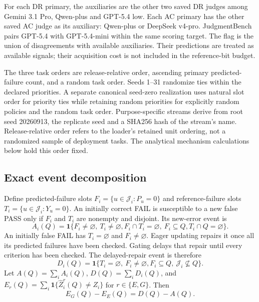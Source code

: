 For each DR primary, the auxiliaries are the other two saved DR judges
among Gemini 3.1 Pro, Qwen-plus and GPT-5.4 low. Each AC primary has the
other saved AC judge as its auxiliary: Qwen-plus or DeepSeek v4-pro.
JudgmentBench pairs GPT-5.4 with GPT-5.4-mini within the same scoring target.
The flag is the union of disagreements with available auxiliaries. Their
predictions are treated as available signals; their acquisition cost is not
included in the reference-bit budget.

The three task orders are release-relative order, ascending primary
predicted-failure count, and a random task order. Seeds 1--31 randomize ties
within the declared priorities. A separate canonical seed-zero realization
uses natural slot order for priority ties while retaining random priorities
for explicitly random policies and the random task order. Purpose-specific
streams derive from root seed 20260913, the replicate seed and a SHA256 hash
of the stream's name. Release-relative order refers to the loader's retained
unit ordering, not a randomized sample of deployment tasks. The analytical
mechanism calculations below hold this order fixed.

\subsection{Exact event decomposition}
\label{app:events}

Define predicted-failure slots $F_i=\{u\in\mathcal J_i:P_u=0\}$ and
reference-failure slots $T_i=\{u\in\mathcal J_i:Y_u=0\}$. An initially
correct FAIL is susceptible to a new false PASS only if $F_i$ and $T_i$ are
nonempty and disjoint. Its new-error event is
\begin{equation}
 A_i(Q)=\mathbf1\{F_i\ne\varnothing,\ T_i\ne\varnothing,
 F_i\cap T_i=\varnothing,\ F_i\subseteq Q,
 T_i\cap Q=\varnothing\}.
 \label{app:eq:introduced}
\end{equation}
An initially false FAIL has $T_i=\varnothing$ and
$F_i\ne\varnothing$. Eager updating repairs it once all its predicted
failures have been checked. Gating delays that repair until every criterion
has been checked. The delayed-repair event is therefore
\begin{equation}
 D_i(Q)=\mathbf1\{T_i=\varnothing,\ F_i\ne\varnothing,
 F_i\subseteq Q,\ \mathcal J_i\not\subseteq Q\}.
 \label{app:eq:delayed}
\end{equation}
Let $A(Q)=\sum_i A_i(Q)$, $D(Q)=\sum_i D_i(Q)$, and
$E_r(Q)=\sum_i\mathbf1\{\widehat Z_i^r(Q)\ne Z_i\}$ for
$r\in\{E,G\}$. Then
\begin{equation}
 E_G(Q)-E_E(Q)=D(Q)-A(Q).
 \label{app:eq:update-identity}
\end{equation}

